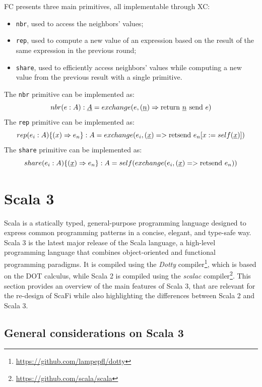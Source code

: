 \ac{FC} presents three main primitives, all implementable through \ac{XC}:
\begin{itemize}
    \item \texttt{nbr}, used to access the neighbors' values\cite{from-dc-to-fc-and-ap};
    \item \texttt{rep}, used to compute a new value of an expression based on the result of the same expression in the previous round\cite{from-dc-to-fc-and-ap};
    \item \texttt{share}, used to efficiently access neighbors' values while computing a new value from the previous result with a single primitive\cite{share-operator}.
\end{itemize}

The \texttt{nbr} primitive can be implemented as: $$nbr(e: A): \underline{A} = exchange(e, (\underline{n}) \Rightarrow \operatorname{return\,} \underline{n} \operatorname{\:send\,} e)$$
%
The \texttt{rep} primitive can be implemented as: $$rep(e_i: A)\{(x) \Rightarrow e_n\}: A = exchange(e_i, (\underline{x}) => \operatorname{retsend\,} e_n[x := self(\underline{x})])$$
%
The \texttt{share} primitive can be implemented as: $$share(e_i: A)\{(\underline{x}) \Rightarrow e_n\}: A = self(exchange(e_i, (\underline{x}) => \operatorname{retsend\,} e_n))$$

\section{Scala 3}\label{chap:background->sec:scala3}

Scala is a statically typed, general-purpose programming language designed to express common programming patterns in a concise, elegant, and type-safe way.
%
Scala 3 is the latest major release of the Scala language, a high-level programming language that combines object-oriented and functional programming paradigms.
%
It is compiled using the \textit{Dotty} compiler\footnote{\url{https://github.com/lampepfl/dotty}}, which is based on the \ac{DOT} calculus\cite{dot}, while Scala 2 is compiled using the \textit{scalac} compiler\footnote{\url{https://github.com/scala/scala}}.
%
This section provides an overview of the main features of Scala 3, that are relevant for the re-design of ScaFi while also highlighting the differences between Scala 2 and Scala 3.

\subsection{General considerations on Scala 3}

